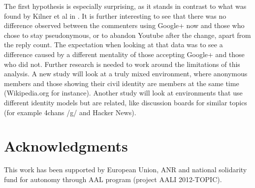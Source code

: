 \documentclass{chi-ext2}
\begin{document}
The first hypothesis is especially surprising, as it stands in contrast to what was found by Kilner et al in \cite{CoPAnonymity}. It is further interesting to see that there was no difference observed between the commenters using Google+ now and those who chose to stay pseudonymous, or to abandon Youtube after the change, apart from the reply count. The expectation when looking at that data was to see a difference caused by a different mentality of those accepting Google+ and those who did not. Further research is needed to work around the limitations of this analysis. A new study will look at a truly mixed environment, where anonymous members and those showing their civil identity are members at the same time (Wikipedia.org for instance). Another study will look at environments that use different identity models but are related, like discussion boards for similar topics (for example 4chans /g/ and Hacker News).

\section{Acknowledgments}
This work has been supported by European Union, ANR and national solidarity fund for autonomy through AAL program (project AALI 2012-TOPIC).

\balance


\end{document}
